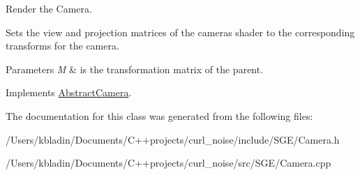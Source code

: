 Render the Camera. 

Sets the view and projection matrices of the cameras shader to the corresponding transforms for the camera. 
\begin{DoxyParams}{Parameters}
{\em M} & is the transformation matrix of the parent. \\
\hline
\end{DoxyParams}


Implements \hyperlink{class_abstract_camera_aaf5b7d99f25d511e75a37c5475912956}{Abstract\-Camera}.



The documentation for this class was generated from the following files\-:\begin{DoxyCompactItemize}
\item 
/\-Users/kbladin/\-Documents/\-C++projects/curl\-\_\-noise/include/\-S\-G\-E/Camera.\-h\item 
/\-Users/kbladin/\-Documents/\-C++projects/curl\-\_\-noise/src/\-S\-G\-E/Camera.\-cpp\end{DoxyCompactItemize}
